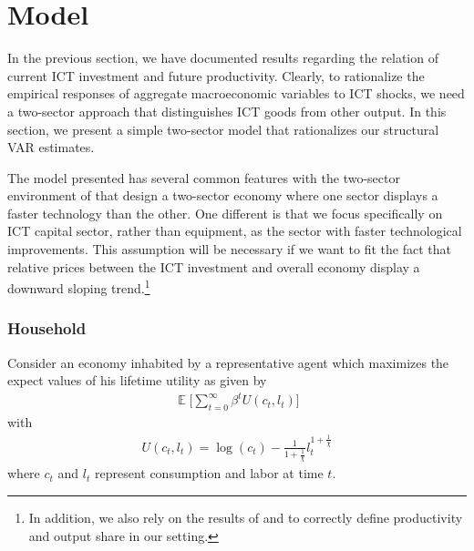 \documentclass[12pt]{article}
\DeclareMathOperator{\E}{\mathbb{E}}
\begin{document}


\section{Model}\label{section:theory}

In the previous section, we have documented results regarding the relation of current ICT investment and future productivity. Clearly, to rationalize the empirical responses of aggregate macroeconomic variables to ICT shocks, we need a two-sector approach that distinguishes ICT goods from other output. In this section, we present a simple two-sector model that rationalizes our structural VAR estimates. 


The model presented has several common features with the two-sector environment of \cite{greenwood1997long} that design a two-sector economy where one sector displays a faster technology than the other. One different is that we focus specifically on ICT capital sector, rather than equipment, as the sector with faster technological improvements. This assumption will be necessary if we want to fit the fact that relative prices between the ICT investment and overall economy display a downward sloping trend.\footnote{In addition, we also rely on the results of \cite{whelan2003two} and \cite{oulton2007investment} to correctly define productivity and output share in our setting.}

\subsubsection{Household}

Consider an economy inhabited by a representative agent which maximizes the expect values of his lifetime utility as given by
\begin{eqnarray}\label{equation:utilFunc}
\E \Bigg[  \sum_{t=0}^{\infty} \beta^t U(c_t,l_t)  \Bigg]
\end{eqnarray}
with 
\begin{eqnarray*}
U(c_t,l_t) = \log(c_t) - \frac{1}{1+\frac{1}{\chi}} l_t^{1+\frac{1}{\chi}}
\end{eqnarray*}
where $c_t$ and $l_t$ represent consumption and labor at time $t$. 
\end{document}
